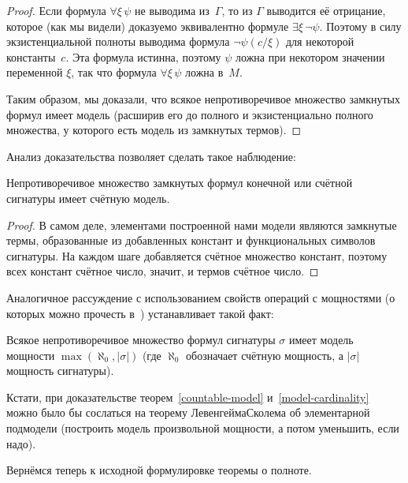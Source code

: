 \begin{proof}
Если формула $\forall\xi\,\psi$ не выводима из~$\Gamma$, то из
$\Gamma$ выводится её отрицание, которое (как мы видели) доказуемо
эквивалентно формуле $\exists\xi\,\lnot\psi$. Поэтому в силу
экзистенциальной полноты выводима формула $\lnot\psi(c/\xi)$ для
некоторой константы~$c$. Эта формула истинна, поэтому $\psi$
ложна при некотором значении переменной $\xi$, так что формула
$\forall\xi\,\psi$ ложна в~$M$.

Таким образом, мы доказали, что всякое непротиворечивое
множество замкнутых формул имеет модель (расширив его до полного
и экзистенциально полного множества, у которого есть модель из замкнутых
термов).
\end{proof}

Анализ доказательства позволяет сделать такое наблюдение:

\begin{theorem}
        \label{countable-model}
Непротиворечивое множество замкнутых формул конечной или счётной
сигнатуры имеет счётную модель.
\end{theorem}

\begin{proof}
В самом деле, элементами построенной нами
модели являются замкнутые термы,
образованные из добавленных констант и функциональных
символов сигнатуры. На каждом шаге добавляется счётное множество
констант, поэтому всех констант счётное число, значит, и термов
счётное число.
\end{proof}

Аналогичное рассуждение с использованием свойств операций
с мощностями (о которых можно прочесть в~\cite{naive-set-theory})
устанавливает такой факт:

\begin{theorem}
        \label{model-cardinality}
Всякое непротиворечивое множество формул сигнатуры $\sigma$
имеет модель мощности $\max(\aleph_0,|\sigma|)$ (где $\aleph_0$
обозначает счётную мощность, а $|\sigma|$\т мощность сигнатуры).
\end{theorem}

Кстати, при доказательстве теорем~\ref{countable-model}
и~\ref{model-cardinality} можно было бы сослаться на теорему
Левенгейма\ч Сколема об элементарной подмодели (построить модель
произвольной мощности, а потом уменьшить, если надо).

Вернёмся теперь к исходной формулировке теоремы о полноте.


